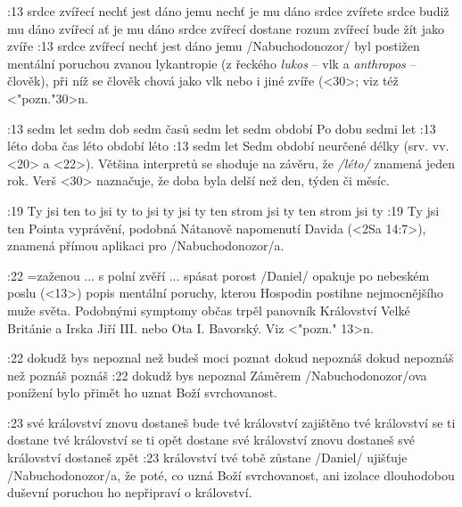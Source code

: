 :13  
    {srdce zvířecí nechť jest dáno jemu}   %
    {nechť je mu dáno srdce zvířete}   %
    {srdce budiž mu dáno zvířecí}   %
    {ať je mu dáno srdce zvířecí}   %
    {dostane rozum zvířecí}   %
    {bude žít jako zvíře}   %
:13 {srdce zvířecí nechť jest dáno jemu} 
     \x/Nabuchodonozor/  byl postižen mentální poruchou zvanou lykantropie 
     (z řeckého {\em lukos} -- vlk a {\em anthropos} -- člověk), 
     při níž  se člověk chová jako vlk nebo i jiné zvíře (<30>; viz též <"pozn."30>n. 

:13  
    {sedm let}   %
    {sedm dob}   %
    {sedm časů}   %
    {sedm let}   %
    {sedm období}   %
    {Po dobu sedmi let}   %
:13  %
    {léto}   %
    {doba}   %
    {čas}   %
    {léto}   %
    {období}   %
    {léto}   %
:13 {sedm let} 
     Sedm období neurčené délky (srv. vv. <20> a <22>). Většina interpretů se shoduje na závěru, že {\em \x/léto/} znamená jeden rok. Verš <30> naznačuje, že doba byla delší než den, týden či měsíc.

:19  
    {Ty jsi ten}   %
    {to jsi ty}   %
    {to jsi ty}   %
    {jsi ty}   %
    {ten strom jsi ty}   %
    {ten strom jsi ty}   %
:19 {Ty jsi ten} Pointa vyprávění, podobná Nátanově napomenutí Davida (<2Sa 14:7>), znamená přímou aplikaci pro \x/Nabuchodonozor/a.

:22 {}={zaženou ... s polní zvěří ... spásat porost}  \x/Daniel/ opakuje po nebeském poslu (<13>) popis mentální poruchy, kterou Hospodin postihne nejmocnějšího muže světa. Podobnými symptomy občas trpěl panovník Království Velké Británie a Irska Jiří III. nebo Ota I. Bavorský. Viz <"pozn." 13>n.

:22
    {dokudž bys nepoznal}   %
    {než budeš moci poznat}   %
    {dokud nepoznáš}   %
    {dokud nepoznáš} %
    {než poznáš}   %
    {poznáš}   %
:22 {dokudž bys nepoznal} Záměrem \x/Nabuchodonozor/ova ponížení bylo přimět ho uznat Boží svrchovanost. 

:23
    {své království znovu dostaneš}   %
    {bude tvé království zajištěno}   %
    {tvé království se ti dostane}   %
    {tvé království se ti opět dostane}   %
    {své království znovu dostaneš}   %
    {své království dostaneš zpět}   %
:23 {království tvé tobě zůstane} \x/Daniel/ ujišťuje \x/Nabuchodonozor/a, že poté, co uzná Boží svrchovanost, ani izolace dlouhodobou duševní poruchou ho nepřipraví o království.

